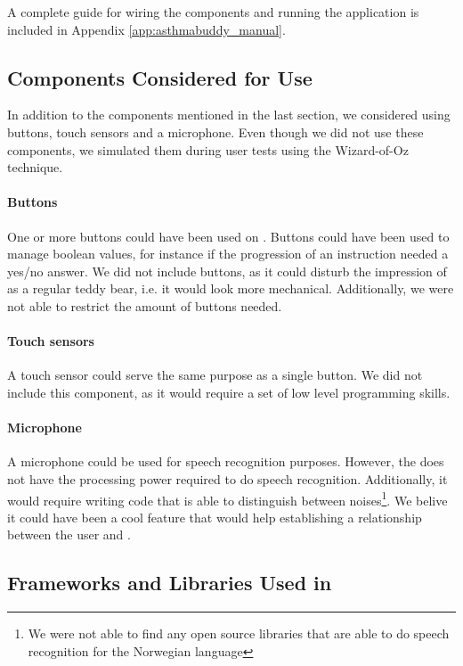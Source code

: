 A complete guide for wiring the components and running the application is included in Appendix \ref{app:asthmabuddy_manual}.

\subsection{Components Considered for Use}
In addition to the components mentioned in the last section, we considered using buttons, touch sensors and a microphone. Even though we did not use these components, we simulated them during user tests using the Wizard-of-Oz technique. 

\paragraph{Buttons}
One or more buttons could have been used on \ab{}. Buttons could have been used to manage boolean values, for instance if the progression of an instruction needed a yes/no answer. We did not include buttons, as it could disturb the impression of \ab{} as a regular teddy bear, i.e. it would look more mechanical. Additionally, we were not able to restrict the amount of buttons needed. 

\paragraph{Touch sensors}
A touch sensor could serve the same purpose as a single button. We did not include this component, as it would require a set of low level programming skills. 

\paragraph{Microphone}
A microphone could be used for speech recognition purposes. However, the \rpi{} does not have the processing power required to do speech recognition. Additionally, it would require writing code that is able to distinguish between noises\footnote{We were not able to find any open source libraries that are able to do speech recognition for the Norwegian language}. We belive it could have been a cool feature that would help establishing a relationship between the user and \ab{}.    

\subsection{Frameworks and Libraries Used in \ab{}} 

